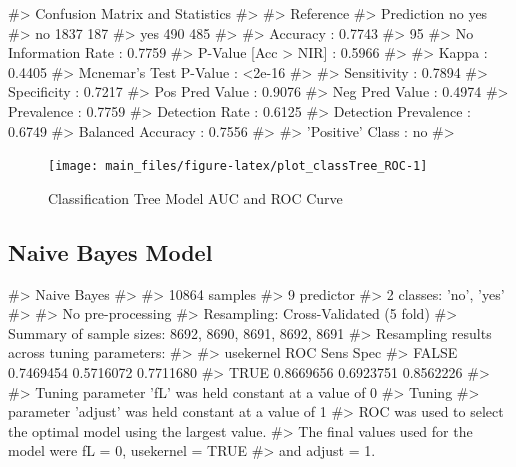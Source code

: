 \begin{Schunk}
\begin{Soutput}
#> Confusion Matrix and Statistics
#> 
#>           Reference
#> Prediction   no  yes
#>        no  1837  187
#>        yes  490  485
#>                                           
#>                Accuracy : 0.7743          
#>                  95%
#>     No Information Rate : 0.7759          
#>     P-Value [Acc > NIR] : 0.5966          
#>                                           
#>                   Kappa : 0.4405          
#>  Mcnemar's Test P-Value : <2e-16          
#>                                           
#>             Sensitivity : 0.7894          
#>             Specificity : 0.7217          
#>          Pos Pred Value : 0.9076          
#>          Neg Pred Value : 0.4974          
#>              Prevalence : 0.7759          
#>          Detection Rate : 0.6125          
#>    Detection Prevalence : 0.6749          
#>       Balanced Accuracy : 0.7556          
#>                                           
#>        'Positive' Class : no              
#> 
\end{Soutput}
\end{Schunk}

\begin{Schunk}
\begin{figure}[H]

{\centering \texttt{[image: main\_files/figure-latex/plot\_classTree\_ROC-1]} 

}

\caption[Classification Tree Model AUC and ROC Curve]{Classification Tree Model AUC and ROC Curve}\label{fig:plot_classTree_ROC}
\end{figure}
\end{Schunk}

\hypertarget{naive-bayes-model}{%
\subsection{Naive Bayes Model}\label{naive-bayes-model}}

\begin{Schunk}
\begin{Soutput}
#> Naive Bayes 
#> 
#> 10864 samples
#>     9 predictor
#>     2 classes: 'no', 'yes' 
#> 
#> No pre-processing
#> Resampling: Cross-Validated (5 fold) 
#> Summary of sample sizes: 8692, 8690, 8691, 8692, 8691 
#> Resampling results across tuning parameters:
#> 
#>   usekernel  ROC        Sens       Spec     
#>   FALSE      0.7469454  0.5716072  0.7711680
#>    TRUE      0.8669656  0.6923751  0.8562226
#> 
#> Tuning parameter 'fL' was held constant at a value of 0
#> Tuning
#>  parameter 'adjust' was held constant at a value of 1
#> ROC was used to select the optimal model using the largest value.
#> The final values used for the model were fL = 0, usekernel = TRUE
#>  and adjust = 1.
\end{Soutput}
\end{Schunk}

